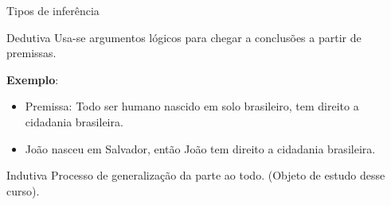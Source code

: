 \documentclass[9pt]{beamer}
\begin{document}
\begin{frame}{Tipos de inferência}
 
 \vfill
 
 \begin{block}{Dedutiva}
  Usa-se argumentos lógicos para chegar a conclusões a partir de premissas.

  \textbf{Exemplo}: 
  \begin{itemize}
   \item Premissa: Todo ser humano nascido em solo brasileiro, tem direito a cidadania brasileira. 
   \item João nasceu em Salvador, então João tem direito a cidadania brasileira.
  \end{itemize}
 \end{block}

 \vfill
 
 \begin{block}{Indutiva}
  Processo de generalização da parte ao todo. (Objeto de estudo desse curso). 
  

\end{block}
\end{frame}
\end{document}
